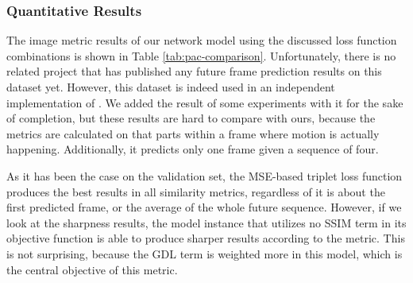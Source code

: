 \subsubsection{Quantitative Results}

The image metric results of our network model using the discussed loss function combinations is shown in Table \ref{tab:pac-comparison}. Unfortunately, there is no related project that has published any future frame prediction results on this dataset yet. However, this dataset is indeed used in an independent implementation of \parencite{deep_multiscale_video_pred}. We added the result of some experiments with it for the sake of completion, but these results are hard to compare with ours, because the metrics are calculated on that parts within a frame where motion is actually happening. Additionally, it predicts only one frame given a sequence of four.

As it has been the case on the validation set, the MSE-based triplet loss function produces the best results in all similarity metrics, regardless of it is about the first predicted frame, or the average of the whole future sequence. However, if we look at the sharpness results, the model instance that utilizes no SSIM term in its objective function is able to produce sharper results according to the metric. This is not surprising, because the GDL term is weighted more in this model, which is the central objective of this metric.

